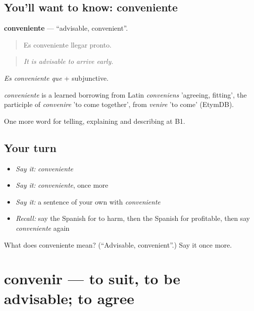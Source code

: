 \subsection*{You'll want to know: conveniente}
\textbf{conveniente} — \textquotedblleft{}advisable, convenient\textquotedblright{}.

\begin{quote}
Es conveniente llegar pronto.
\end{quote}

\begin{quote}
\emph{It is advisable to arrive early.}
\end{quote}

\emph{Es conveniente que} + subjunctive.

\begin{cousinweb}
\emph{conveniente} is a learned borrowing from Latin \emph{conveniens} 'agreeing, fitting', the participle of \emph{convenire} 'to come together', from \emph{venire} 'to come' (EtymDB).
\end{cousinweb}

\begin{grammarlens}[title={What you've built}]
One more word for telling, explaining and describing at B1.
\end{grammarlens}

\subsection*{Your turn}
\begin{itemize}
\raggedright
  \item \emph{Say it:} \emph{conveniente}
  \item \emph{Say it:} \emph{conveniente}, once more
  \item \emph{Say it:} a sentence of your own with \emph{conveniente}
  \item \emph{Recall:} say the Spanish for to harm, then the Spanish for profitable, then say \emph{conveniente} again
\end{itemize}

\begin{tcolorbox}[breakable,colback=teal!4,colframe=teal!35!black,title={Before you move on}]
What does conveniente mean? (\textquotedblleft{}Advisable, convenient\textquotedblright{}.) Say it once more.
\end{tcolorbox}
\section[convenir]{convenir — to suit, to be advisable; to agree}

